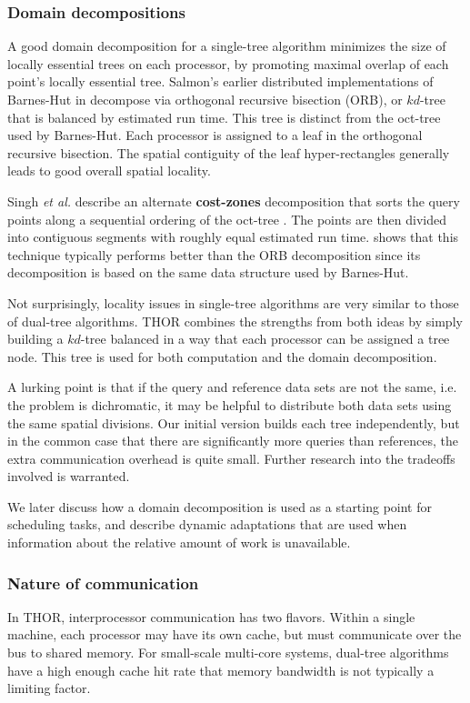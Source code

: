 \documentclass[twoside,leqno,twocolumn]{article}
\newcommand{\mysubsub}[1]{\subsubsection{#1} }
\newcommand{\defterm}[1]{{\bf #1}}
\begin{document}
\mysubsub{Domain decompositions}
A good domain decomposition for a single-tree algorithm minimizes the size of locally essential trees on each processor, by promoting maximal overlap of each point's locally essential tree.
Salmon's earlier distributed implementations of Barnes-Hut in \cite{salmon_thesis} decompose via orthogonal recursive bisection (ORB), or $kd$-tree that is balanced by estimated run time.
This tree is distinct from the oct-tree used by Barnes-Hut.
Each processor is assigned to a leaf in the orthogonal recursive bisection.
The spatial contiguity of the leaf hyper-rectangles generally leads to good overall spatial locality.

Singh {\it et al.} describe an alternate \defterm{cost-zones} decomposition that sorts the query points along a sequential ordering of the oct-tree \cite{singh95load}.
The points are then divided into contiguous segments with roughly equal estimated run time.
\cite{singh95load} shows that this technique typically performs better than the ORB decomposition since its decomposition is based on the same data structure used by Barnes-Hut.

Not surprisingly, locality issues in single-tree algorithms are very similar to those of dual-tree algorithms.
THOR combines the strengths from both ideas by simply building a $kd$-tree balanced in a way that each processor can be assigned a tree node.
This tree is used for both computation and the domain decomposition.

A lurking point is that if the query and reference data sets are not the same, i.e. the problem is dichromatic, it may be helpful to distribute both data sets using the same spatial divisions.
Our initial version builds each tree independently, but in the common case that there are significantly more queries than references, the extra communication overhead is quite small.
Further research into the tradeoffs involved is warranted.

We later discuss how a domain decomposition is used as a starting point for scheduling tasks, and describe dynamic adaptations that are used when information about the relative amount of work is unavailable.

\mysubsub{Nature of communication}

In THOR, interprocessor communication has two flavors.
Within a single machine, each processor may have its own cache, but must communicate over the bus to shared memory.
For small-scale multi-core systems, dual-tree algorithms have a high enough cache hit rate that memory bandwidth is not typically a limiting factor.
\end{document}
